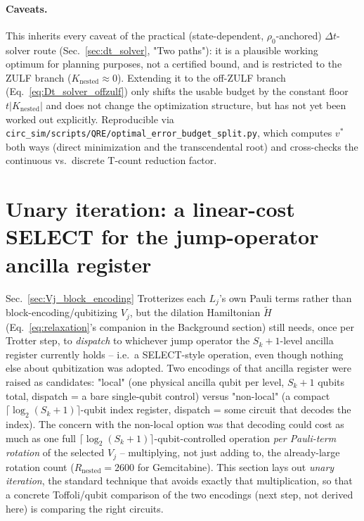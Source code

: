 \documentclass[11pt]{article}
\newcommand{\Dt}{\Delta t}
\newcommand{\Ht}{\tilde{H}}
\begin{document}
\paragraph{Caveats.} This inherits every caveat of the practical (state-dependent, $\rho_0$-anchored) $\Dt$-solver route (Sec.~\ref{sec:dt_solver}, "Two paths"): it is a plausible working optimum for planning purposes, not a certified bound, and is restricted to the ZULF branch ($K_{\text{nested}}\approx0$). Extending it to the off-ZULF branch (Eq.~\eqref{eq:Dt_solver_offzulf}) only shifts the usable budget by the constant floor $t|K_{\text{nested}}|$ and does not change the optimization structure, but has not yet been worked out explicitly. Reproducible via \texttt{circ\_sim/scripts/QRE/optimal\_error\_budget\_split.py}, which computes $v^\ast$ both ways (direct minimization and the transcendental root) and cross-checks the continuous vs.\ discrete T-count reduction factor.

\section{Unary iteration: a linear-cost SELECT for the jump-operator ancilla register}
\label{sec:unary_iteration}

Sec.~\ref{sec:Vj_block_encoding} Trotterizes each $L_j$'s own Pauli terms rather than block-encoding/qubitizing $V_j$, but the dilation Hamiltonian $\Ht$ (Eq.~\eqref{eq:relaxation}'s companion in the Background section) still needs, once per Trotter step, to \emph{dispatch} to whichever jump operator the $S_k+1$-level ancilla register currently holds -- i.e.\ a SELECT-style operation, even though nothing else about qubitization was adopted. Two encodings of that ancilla register were raised as candidates: "local" (one physical ancilla qubit per level, $S_k+1$ qubits total, dispatch = a bare single-qubit control) versus "non-local" (a compact $\lceil\log_2(S_k+1)\rceil$-qubit index register, dispatch = some circuit that decodes the index). The concern with the non-local option was that decoding could cost as much as one full $\lceil\log_2(S_k+1)\rceil$-qubit-controlled operation \emph{per Pauli-term rotation} of the selected $V_j$ -- multiplying, not just adding to, the already-large rotation count ($R_{\text{nested}}=2600$ for Gemcitabine). This section lays out \emph{unary iteration}, the standard technique that avoids exactly that multiplication, so that a concrete Toffoli/qubit comparison of the two encodings (next step, not derived here) is comparing the right circuits.
\end{document}
